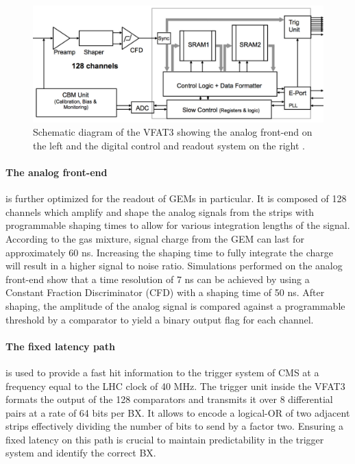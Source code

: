       \begin{figure}[h!]
        \centering
        \includegraphics[width=\textwidth]{img/II-2-daq/vfat3.pdf}
        \caption{Schematic diagram of the VFAT3 showing the analog front-end on the left and the digital control and readout system on the right \cite{Colaleo:2021453}.}
        \label{fig:II-2-vfat3}
      \end{figure}

      \paragraph{The analog front-end} is further optimized for the readout of GEMs in particular. It is composed of 128 channels which amplify and shape the analog signals from the strips with programmable shaping times to allow for various integration lengths of the signal. According to the gas mixture, signal charge from the GEM can last for approximately 60 ns. Increasing the shaping time to fully integrate the charge will result in a higher signal to noise ratio. Simulations \cite{Thierry:2065693} performed on the analog front-end show that a time resolution of 7 ns can be achieved by using a Constant Fraction Discriminator (CFD) with a shaping time of 50 ns. After shaping, the amplitude of the analog signal is compared against a programmable threshold by a comparator to yield a binary output flag for each channel. \\

      \paragraph{The fixed latency path} is used to provide a fast hit information to the trigger system of CMS at a frequency equal to the LHC clock of 40 MHz. The trigger unit inside the VFAT3 formats the output of the 128 comparators and transmits it over 8 differential pairs at a rate of 64 bits per BX. It allows to encode a logical-OR of two adjacent strips effectively dividing the number of bits to send by a factor two. Ensuring a fixed latency on this path is crucial to maintain predictability in the trigger system and identify the correct BX. \\

